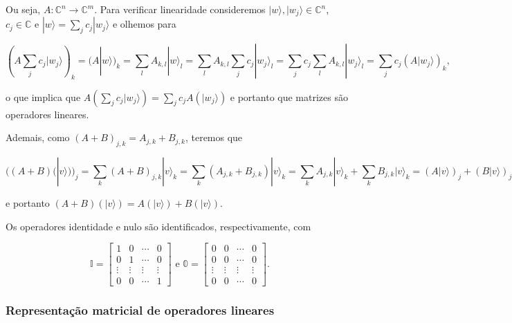 \documentclass[11pt]{article}
\begin{document}
Ou seja, \(A:\mathbb{C}^{n}\rightarrow\mathbb{C}^{m}\). Para verificar
linearidade consideremos \(|w\rangle,|w_{j}\rangle\in\mathbb{C}^{n}\),
\(c_{j}\in\mathbb{C}\) e \(|w\rangle=\sum_{j}c_{j}|w_{j}\rangle\) e
olhemos para

\begin{equation}
\left(A\sum_{j}c_{j}|w_{j}\rangle\right)_{k} = (A|w\rangle)_{k} = \sum_{l}A_{k,l}|w\rangle_{l} = \sum_{l}A_{k,l}\sum_{j}c_{j}|w_{j}\rangle_{l} = \sum_{j}c_{j}\sum_{l}A_{k,l}|w_{j}\rangle_{l} = \sum_{j}c_{j}(A|w_{j}\rangle)_{k},
\end{equation}

o que implica que
\(A(\sum_{j}c_{j}|w_{j}\rangle)=\sum_{j}c_{j}A(|w_{j}\rangle)\) e
portanto que matrizes são operadores lineares.

Ademais, como \((A+B)_{j,k}=A_{j,k}+B_{j,k}\), teremos que

\begin{equation}
((A+B)(|v\rangle))_{j} = \sum_{k}(A+B)_{j,k}|v\rangle_{k} = \sum_{k}(A_{j,k}+B_{j,k})|v\rangle_{k} = \sum_{k}A_{j,k}|v\rangle_{k} + \sum_{k}B_{j,k}|v\rangle_{k} = (A|v\rangle)_{j}+ (B|v\rangle)_{j}
\end{equation}

e portanto \((A+B)(|v\rangle)= A(|v\rangle) + B(|v\rangle)\).

Os operadores identidade e nulo são identificados, respectivamente, com

\begin{equation}
\mathbb{I}=\begin{bmatrix} 1 & 0 & \cdots & 0 \\ 0 & 1 & \cdots & 0 \\ \vdots & \vdots & \vdots & \vdots \\ 0 & 0 & \cdots & 1 \end{bmatrix} \text{ e } \mathbb{0}=\begin{bmatrix} 0 & 0 & \cdots & 0 \\ 0 & 0 & \cdots & 0 \\ \vdots & \vdots & \vdots & \vdots \\ 0 & 0 & \cdots & 0 \end{bmatrix}.
\end{equation}

    \subsubsection{Representação matricial de operadores
lineares}\label{representauxe7uxe3o-matricial-de-operadores-lineares}
\end{document}
